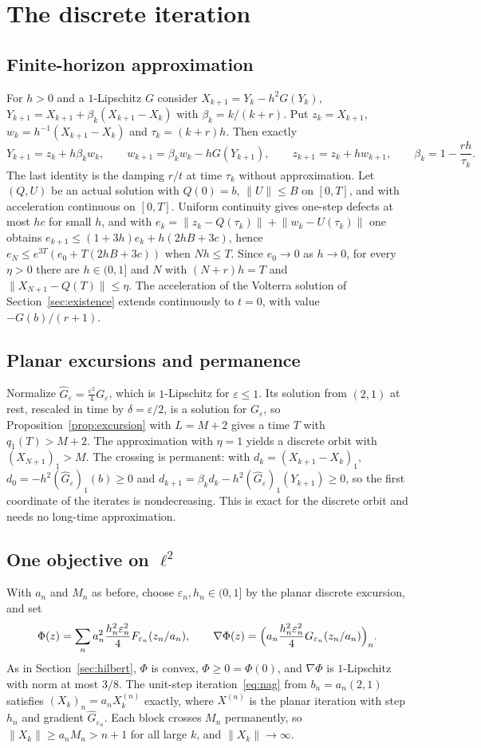 \documentclass[11pt]{article}
\numberwithin{equation}{section}
\theoremstyle{definition}
\theoremstyle{remark}
\newcommand{\norm}[1]{\lVert #1\rVert}
\newcommand{\eps}{\varepsilon}
\begin{document}
\section{The discrete iteration}\label{sec:discrete}
\subsection{Finite-horizon approximation}
For $h>0$ and a $1$-Lipschitz $G$ consider $X_{k+1}=Y_k-h^2G(Y_k)$, $Y_{k+1}=X_{k+1}+\beta_k(X_{k+1}-X_k)$ with $\beta_k=k/(k+r)$. Put $z_k=X_{k+1}$, $w_k=h^{-1}(X_{k+1}-X_k)$ and $\tau_k=(k+r)h$. Then exactly
\[
Y_{k+1}=z_k+h\beta_kw_k,\qquad w_{k+1}=\beta_kw_k-hG(Y_{k+1}),\qquad z_{k+1}=z_k+hw_{k+1},\qquad \beta_k=1-\frac{rh}{\tau_k}.
\]
The last identity is the damping $r/t$ at time $\tau_k$ without approximation. Let $(Q,U)$ be an actual solution with $Q(0)=b$, $\norm U\le B$ on $[0,T]$, and with acceleration continuous on $[0,T]$. Uniform continuity gives one-step defects at most $hc$ for small $h$, and with $e_k=\norm{z_k-Q(\tau_k)}+\norm{w_k-U(\tau_k)}$ one obtains $e_{k+1}\le(1+3h)e_k+h(2hB+3c)$, hence $e_N\le e^{3T}(e_0+T(2hB+3c))$ when $Nh\le T$. Since $e_0\to0$ as $h\to0$, for every $\eta>0$ there are $h\in(0,1]$ and $N$ with $(N+r)h=T$ and $\norm{X_{N+1}-Q(T)}\le\eta$. The acceleration of the Volterra solution of Section~\ref{sec:existence} extends continuously to $t=0$, with value $-G(b)/(r+1)$.

\subsection{Planar excursions and permanence}
Normalize $\widehat G_\eps=\frac{\eps^2}4G_\eps$, which is $1$-Lipschitz for $\eps\le1$. Its solution from $(2,1)$ at rest, rescaled in time by $\delta=\eps/2$, is a solution for $G_\eps$, so Proposition~\ref{prop:excursion} with $L=M+2$ gives a time $T$ with $q_1(T)>M+2$. The approximation with $\eta=1$ yields a discrete orbit with $(X_{N+1})_1>M$. The crossing is permanent: with $d_k=(X_{k+1}-X_k)_1$, $d_0=-h^2(\widehat G_\eps)_1(b)\ge0$ and $d_{k+1}=\beta_kd_k-h^2(\widehat G_\eps)_1(Y_{k+1})\ge0$, so the first coordinate of the iterates is nondecreasing. This is exact for the discrete orbit and needs no long-time approximation.

\subsection{One objective on \texorpdfstring{$\ell^2$}{l2}}
With $a_n$ and $M_n$ as before, choose $\eps_n,h_n\in(0,1]$ by the planar discrete excursion, and set
\[
\Phi(z)=\sum_na_n^2\frac{h_n^2\eps_n^2}4F_{\eps_n}(z_n/a_n),\qquad \nabla\Phi(z)=\Bigl(a_n\frac{h_n^2\eps_n^2}4G_{\eps_n}(z_n/a_n)\Bigr)_n.
\]
As in Section~\ref{sec:hilbert}, $\Phi$ is convex, $\Phi\ge0=\Phi(0)$, and $\nabla\Phi$ is $1$-Lipschitz with norm at most $3/8$. The unit-step iteration~\eqref{eq:nag} from $b_n=a_n(2,1)$ satisfies $(X_k)_n=a_nX^{(n)}_k$ exactly, where $X^{(n)}$ is the planar iteration with step $h_n$ and gradient $\widehat G_{\eps_n}$. Each block crosses $M_n$ permanently, so $\norm{X_k}\ge a_nM_n>n+1$ for all large $k$, and $\norm{X_k}\to\infty$.
\end{document}
